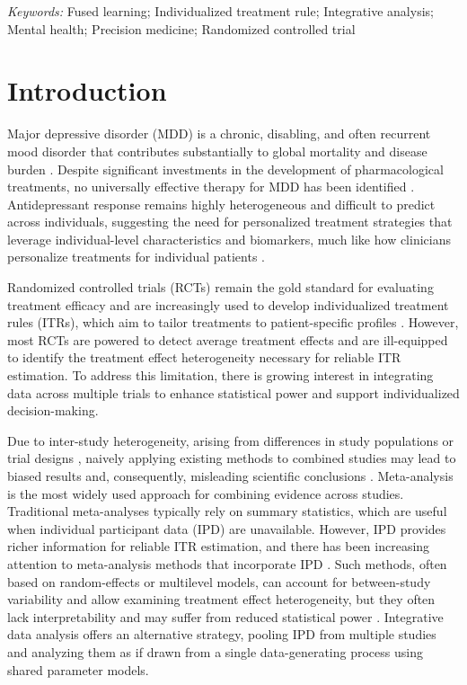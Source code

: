 \documentclass[12pt]{article}
\begin{document}
\noindent%
{\it Keywords:}
Fused learning; Individualized treatment rule; Integrative analysis; Mental health; Precision medicine; Randomized controlled trial


\doublespacing
\allowdisplaybreaks

\section{Introduction}
Major depressive disorder (MDD) is a chronic, disabling, and often recurrent mood disorder that contributes substantially to global mortality and disease burden \citep{friedrich2017depression, bitter2024mortality}. Despite significant investments in the development of pharmacological treatments, no universally effective therapy for MDD has been identified \citep{saveanu2015international,trivedi2016establishing}. Antidepressant response remains highly heterogeneous and difficult to predict across individuals, suggesting the need for personalized treatment strategies that leverage individual-level characteristics and biomarkers, much like how clinicians personalize treatments for individual patients \citep{liu2016there}.

Randomized controlled trials (RCTs) remain the gold standard for evaluating treatment efficacy and are increasingly used to develop individualized treatment rules (ITRs), which aim to tailor treatments to patient-specific profiles \citep[e.g.,][]{qian2011performance,zhao2012estimating,liu2018augmented}. However, most RCTs are powered to detect average treatment effects and are ill-equipped to identify the treatment effect heterogeneity necessary for reliable ITR estimation. To address this limitation, there is growing interest in integrating data across multiple trials to enhance statistical power and support individualized decision-making.

Due to inter-study heterogeneity, arising from differences in study populations or trial designs \citep{sutton2008recent}, naively applying existing methods to combined studies may lead to biased results and, consequently, misleading scientific conclusions \citep{tang2016fused}. Meta-analysis \citep{whitehead2002meta} is the most widely used approach for combining evidence across studies. Traditional meta-analyses typically rely on summary statistics, which are useful when individual participant data (IPD) are unavailable. However, IPD provides richer information for reliable ITR estimation, and there has been increasing attention to meta-analysis methods that incorporate IPD \citep[e.g.,][]{riley2008meta, debray2013framework}. Such methods, often based on random-effects or multilevel models, can account for between-study variability and allow examining treatment effect heterogeneity, but they often lack interpretability and may suffer from reduced statistical power \citep{tang2016fused}. Integrative data analysis \citep[IDA;][]{curran2009integrative, brown2018two} offers an alternative strategy, pooling IPD from multiple studies and analyzing them as if drawn from a single data-generating process using shared parameter models. 
\end{document}
